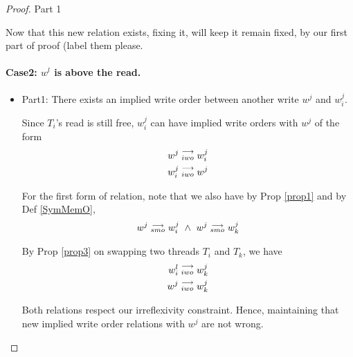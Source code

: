 \begin{proof}{Part 1}
\begin{itemize}
                \end{itemize}
                    Now that this new relation exists, fixing it, will keep it remain fixed, by our first part of proof (label them please. 
                    
            
            \paragraph{Case2: $w^l$ is above the read.}
                
                \begin{itemize}
                    \item Part1: There exists an implied write order between another write $w^j$ and $w_i^j$.

                        Since $T_i$'s read is still free, $w_i^j$ can have implied write orders with $w^j$ of the form
                        \begin{align*}
                            w^j\stackrel{\longrightarrow}{_{iwo}}w_i^j \\
                            w_i^j\stackrel{\longrightarrow}{_{iwo}}w^j 
                        \end{align*}

                        For the first form of relation, note that we also have by Prop \ref{prop1} and by Def \ref{SymMemO}, 
                        \begin{align*}
                            \reln{w^j}{smo}{w_i^j} \ \wedge \ \reln{w^j}{smo}{w_k^j}
                        \end{align*}

                        By Prop \ref{prop3} on swapping two threads $T_i$ and $T_k$, we have 
                        \begin{align*}
                            w_i^l\stackrel{\longrightarrow}{_{iwo}}w_k^j \\
                            w^j\stackrel{\longrightarrow}{_{iwo}}w_k^j
                        \end{align*}

                        Both relations respect our irreflexivity constraint.  Hence, maintaining that new implied write order relations with    $w^j$  are not wrong.


\end{itemize}
\end{proof}
